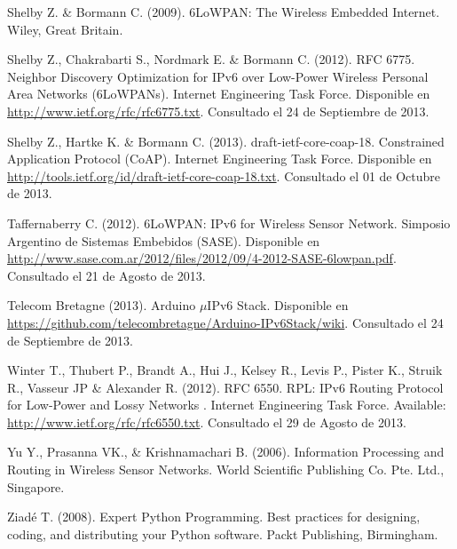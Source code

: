 \begin{spacing}{1.0}
\begin{thebibliography}{99}
Shelby Z. \& Bormann C. (2009).
\newblock 6LoWPAN: The Wireless Embedded Internet.
\newblock Wiley, Great Britain.

Shelby Z., Chakrabarti S., Nordmark E. \& Bormann C. (2012).
\newblock RFC 6775. Neighbor Discovery Optimization for IPv6 over Low-Power Wireless Personal Area Networks (6LoWPANs). Internet Engineering Task Force.
\newblock Disponible en \url{http://www.ietf.org/rfc/rfc6775.txt}.
\newblock Consultado el 24 de Septiembre de 2013.

Shelby Z., Hartke K. \& Bormann C. (2013).
\newblock draft-ietf-core-coap-18. Constrained Application Protocol (CoAP). Internet Engineering Task Force.
\newblock Disponible en \url{http://tools.ietf.org/id/draft-ietf-core-coap-18.txt}.
\newblock Consultado el 01 de Octubre de 2013.

Taffernaberry  C. (2012).
\newblock 6LoWPAN: IPv6 for Wireless Sensor Network.
\newblock Simposio Argentino de Sistemas Embebidos (SASE).
\newblock Disponible en \url{http://www.sase.com.ar/2012/files/2012/09/4-2012-SASE-6lowpan.pdf}.
\newblock Consultado el 21 de Agosto de 2013. 

Telecom Bretagne (2013).
\newblock Arduino $\mu$IPv6 Stack.
\newblock Disponible en \url{https://github.com/telecombretagne/Arduino-IPv6Stack/wiki}.
\newblock Consultado el 24 de Septiembre de 2013. 

Winter T., Thubert P., Brandt A., Hui J., Kelsey R., Levis P., Pister K., Struik R., Vasseur JP \& Alexander R. (2012). 
\newblock RFC 6550. RPL: IPv6 Routing Protocol for Low-Power and Lossy Networks . Internet Engineering Task Force.
\newblock Available: \url{http://www.ietf.org/rfc/rfc6550.txt}.
\newblock Consultado el 29 de Agosto de 2013.

Yu Y., Prasanna VK., \& Krishnamachari B. (2006).
\newblock Information Processing and Routing in Wireless Sensor Networks.
\newblock World Scientific Publishing Co. Pte. Ltd., Singapore.

Ziadé T. (2008).
\newblock Expert Python Programming. Best practices for designing, coding, and distributing your Python software.
\newblock Packt Publishing, Birmingham.

\end{thebibliography}	
\end{spacing}

